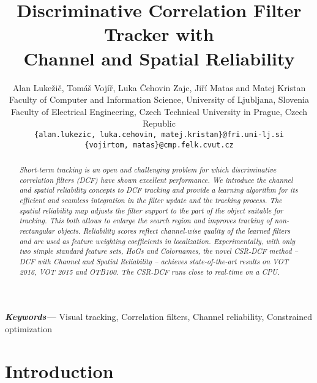 \documentclass[twocolumn]{article}
\date{\vspace{-5ex}}
\providecommand{\keywords}[1]{\textbf{\textit{Keywords---}} #1}
\begin{document}
\title{Discriminative Correlation Filter Tracker with \\ Channel and Spatial Reliability}  
 




\author{Alan Lukežič, Tomáš Vojíř, Luka Čehovin Zajc, Jiří Matas and Matej Kristan\\
Faculty of Computer and Information Science, University of Ljubljana, Slovenia \\
Faculty of Electrical Engineering, Czech Technical University in Prague, Czech Republic \\
{\tt\small \{alan.lukezic, luka.cehovin, matej.kristan\}@fri.uni-lj.si} \\
{\tt\small \{vojirtom, matas\}@cmp.felk.cvut.cz} \\
}











\maketitle

\begin{abstract}
{\it Short-term tracking is an open and challenging  problem for which discriminative correlation filters (DCF) have shown  excellent performance. We introduce the channel and spatial reliability concepts to DCF tracking and provide a learning algorithm for its efficient and seamless integration in the filter update and the tracking process. The spatial reliability map adjusts the  filter support to the part of the object suitable for tracking. This both allows to enlarge the search region and  improves tracking of non-rectangular objects.   Reliability scores reflect channel-wise quality of the learned filters and are used as feature weighting coefficients in localization. Experimentally,  with only two simple standard  feature sets, HoGs and Colornames, the novel CSR-DCF method -- DCF with Channel and Spatial Reliability -- achieves state-of-the-art results on VOT 2016, VOT 2015 and OTB100. The CSR-DCF runs close to real-time on a CPU.}
\end{abstract}

\noindent \keywords{Visual tracking, Correlation filters, Channel reliability, Constrained optimization}


\section{Introduction}  \label{sec:introduction}
\end{document}
